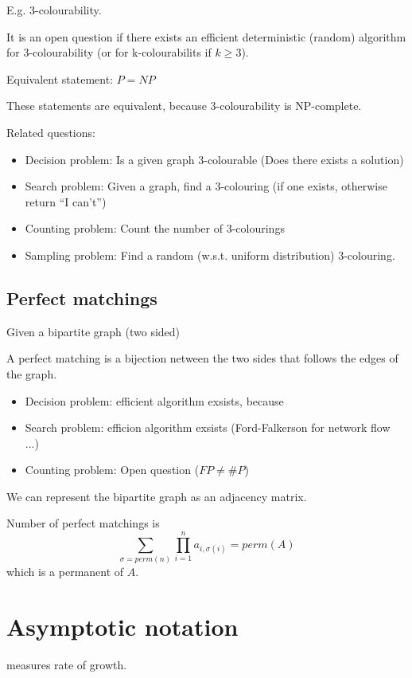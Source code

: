 \documentclass[a4paper,12pt]{article}
\theoremstyle{definition}
\theoremstyle{remark}
\begin{document}
E.g. 3-colourability.

It is an open question if there exists an efficient deterministic (random) algorithm for 3-colourability (or for k-colourabilits if $k \geq 3$).

Equivalent statement: $P = NP$

These statements are equivalent, because 3-colourability is NP-complete.

Related questions:
\begin{itemize}
    \item Decision problem: Is a given graph 3-colourable (Does there exists a solution)
    \item Search problem: Given a graph, find a 3-colouring (if one exists, otherwise return ``I can't'')
    \item Counting problem: Count the number of 3-colourings
    \item Sampling problem: Find a random (w.s.t. uniform distribution) 3-colouring.
\end{itemize}

\subsection{Perfect matchings}
Given a bipartite graph (two sided)

A perfect matching is a bijection netween the two sides that follows the edges of the graph.

\begin{itemize}
  \item Decision problem: efficient algorithm exsists, because
  \item Search problem: efficion algorithm exsists (Ford-Falkerson for network flow ...)
  \item Counting problem: Open question ($FP \neq \#P$)
\end{itemize}

We can represent the bipartite graph as an adjacency matrix.

Number of perfect matchings is 
\begin{equation*}
  \sum_{\sigma = perm(n)} \prod_{i = 1}^{n} a_{i, \sigma(i)} = perm(A)
\end{equation*}
which is a permanent of $A$.


\section{Asymptotic notation}
measures rate of growth.
\end{document}
